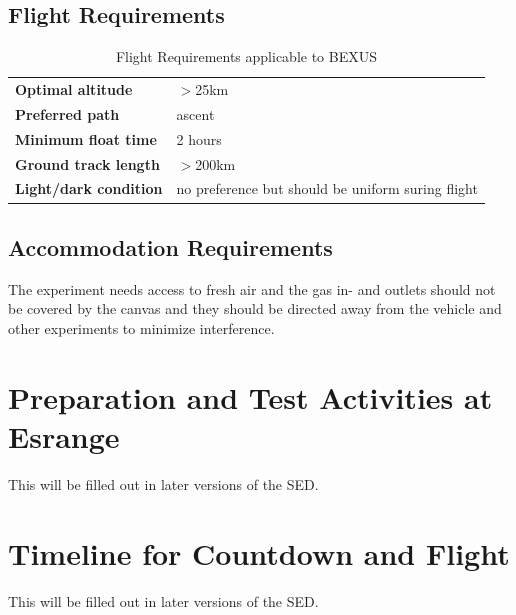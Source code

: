 \documentclass[12pt,a4paper]{report}
\begin{document}
\subsection{Flight Requirements}

\begin{table}[h]
\centering
\caption{Flight Requirements applicable to BEXUS}
\label{tab:flight_req_bexus}
\begin{tabular}{p{5cm} p{10cm}}
\toprule
\textbf{Optimal altitude} & $>$25km\\
\textbf{Preferred path} & ascent \\
\textbf{Minimum float time} & 2 hours\\
\textbf{Ground track length} & $>$200km\\
\textbf{Light/dark condition} & no preference but should be uniform suring flight\\
\bottomrule
\end{tabular}
\end{table}
\clearpage

\subsection{Accommodation Requirements}
The experiment needs access to fresh air and the gas in- and outlets should not be covered by the canvas and they should be directed away from the vehicle and other experiments to minimize interference. 

\section{Preparation and Test Activities at Esrange}
This will be filled out in later versions of the SED.


\clearpage

\section{Timeline for Countdown and Flight}
This will be filled out in later versions of the SED.
\end{document}
